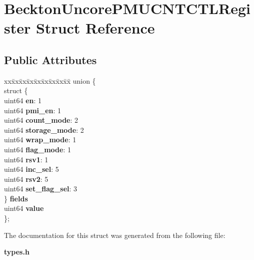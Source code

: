 \section{Beckton\+Uncore\+P\+M\+U\+C\+N\+T\+C\+T\+L\+Register Struct Reference}
\label{structBecktonUncorePMUCNTCTLRegister}
\subsection*{Public Attributes}
\begin{DoxyCompactItemize}
\item 
\begin{tabbing}
xx\=xx\=xx\=xx\=xx\=xx\=xx\=xx\=xx\=\kill
union \{\\
\>struct \{\\
\>\>uint64 {\bfseries en}: 1\\
\>\>uint64 {\bfseries pmi\_en}: 1\\
\>\>uint64 {\bfseries count\_mode}: 2\\
\>\>uint64 {\bfseries storage\_mode}: 2\\
\>\>uint64 {\bfseries wrap\_mode}: 1\\
\>\>uint64 {\bfseries flag\_mode}: 1\\
\>\>uint64 {\bfseries rsv1}: 1\\
\>\>uint64 {\bfseries inc\_sel}: 5\\
\>\>uint64 {\bfseries rsv2}: 5\\
\>\>uint64 {\bfseries set\_flag\_sel}: 3\\
\>\} {\bfseries fields}\\
\>uint64 {\bfseries value}\\
\}; \label{structBecktonUncorePMUCNTCTLRegister_a33cae53d33d55aadf24adf89ddbf4b62}
\\

\end{tabbing}\end{DoxyCompactItemize}


The documentation for this struct was generated from the following file\+:\begin{DoxyCompactItemize}
\item 
{\bf types.\+h}\end{DoxyCompactItemize}
